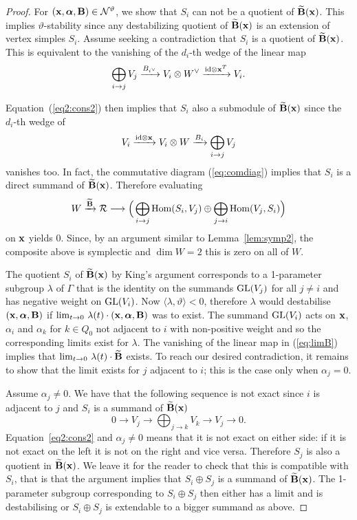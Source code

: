 \documentclass{amsart}
\newcommand{\balpha}{\boldsymbol{\alpha}}
\theoremstyle{definition}
\begin{document}
\begin{proof}
For $(\bfx, \balpha, \bfB) \in \cN^\vartheta$, we show that $S_i$ can not be a quotient of $\widetilde{\mathbf{B}}(\mathbf{x})$. This implies $\vartheta$-stability since any destabilizing quotient of $\widetilde{\mathbf{B}}(\mathbf{x})$ is an extension of vertex simples $S_i$.
Assume seeking a contradiction that $S_i$ is a quotient of $\widetilde{\mathbf{B}}(\mathbf{x})$.
This is equivalent to the vanishing of the $d_i$-th wedge of the linear map
$$\bigoplus_{i \rightarrow j} V_j \xrightarrow{B_{i^\vee}} V_i \otimes W^\vee \xrightarrow{\text{id} \otimes \mathbf{x}^T} V_i.$$

Equation~(\ref{eq2:cons2}) then implies that $S_i$ also a submodule of $\widetilde{\mathbf{B}}(\mathbf{x})$ since the $d_i$-th wedge of 
$$V_i \xrightarrow{\text{id} \otimes \mathbf{x}} V_i \otimes W \xrightarrow{B_i} \bigoplus_{i \rightarrow j} V_j$$
vanishes too.
In fact, the commutative diagram (\ref{eq:comdiag}) implies that $S_i$ is a direct summand of $\widetilde{\mathbf{B}}(\mathbf{x})$.
Therefore evaluating 
\begin{equation}\label{eq:limB}
W \xrightarrow{\widetilde{\mathbf{B}}} \mathcal{R} \longrightarrow \Big(\bigoplus_{i \rightarrow j} \operatorname{Hom}(S_i,V_j) \oplus \bigoplus_{j \rightarrow i} \operatorname{Hom}(V_j, S_i)\Big)
\end{equation}
on $\mathbf{x}$ yields 0.
Since, by an argument similar to Lemma~\ref{lem:symp2}, the composite above is symplectic and $\dim W=2$ this is zero on all of $W$.

The quotient $S_i$ of $\widetilde{\mathbf{B}}(\mathbf{x})$ by King's argument corresponds to a 1-parameter subgroup $\lambda$ of $\Gamma$ that is the identity on the summands $\operatorname{GL}(V_j)$ for all $j\neq i$ and has negative weight on $\operatorname{GL}(V_i)$. 
Now $\langle \lambda, \vartheta\rangle <0$, therefore $\lambda$ would destabilise $(\bfx, \balpha, \bfB)$ if $\lim_{t \rightarrow 0} \, \lambda(t)\cdot (\bfx, \balpha, \bfB)$ was to exist.
The summand $\operatorname{GL}(V_i)$ acts on $\mathbf{x}$, $\alpha_i$ and $\alpha_k$ for $k \in Q_0$ not adjacent to $i$ with non-positive weight and so the corresponding limits exist for $\lambda$.
The vanishing of the linear map in (\ref{eq:limB}) implies that $\lim_{t \rightarrow 0}\, \lambda(t)\cdot \widetilde{\mathbf{B}}$ exists.
To reach our desired contradiction, it remains to show that the limit exists for $j$ adjacent to $i$; this is the case only when $\alpha_j=0$.

Assume $\alpha_j \neq 0$.
We have that the following sequence is not exact since $i$ is adjacent to $j$ and $S_i$ is a summand of $\widetilde{\mathbf{B}}(\mathbf{x})$
$$0 \longrightarrow V_j \longrightarrow \bigoplus_{j \rightarrow k} V_k \longrightarrow V_j \longrightarrow 0.$$
Equation~\ref{eq2:cons2} and $\alpha_j \neq 0$ means that it is not exact on either side: if it is not exact on the left it is not on the right and vice versa.
Therefore $S_j$ is also a quotient in $\widetilde{\mathbf{B}}(\mathbf{x})$.
We leave it for the reader to check that this is compatible with $S_i$, that is that the argument implies that $S_i \oplus S_j$ is a summand of $\widetilde{\mathbf{B}}(\mathbf{x})$.
The 1-parameter subgroup corresponding to $S_i \oplus S_j$ then either has a limit and is destabilising or $S_i \oplus S_j$ is extendable to a bigger summand as above.
\end{proof}
\end{document}
